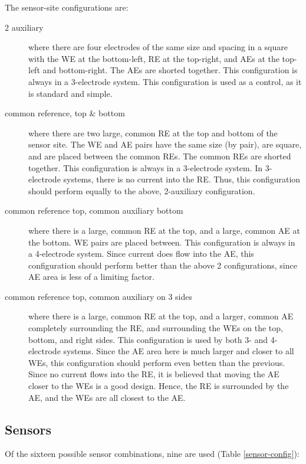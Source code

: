 The sensor-site configurations are:

\begin{description}
\item[2 auxiliary] where there are four electrodes of the same size and spacing in a square with the WE at the bottom-left, RE at the top-right, and AEs at the top-left and bottom-right. The AEs are shorted together. This configuration is always in a 3-electrode system. This configuration is used as a control, as it is standard and simple.
\item[common reference, top \& bottom] where there are two large, common RE at the top and bottom of the sensor site. The WE and AE pairs have the same size (by pair), are square, and are placed between the common REs. The common REs are shorted together. This configuration is always in a 3-electrode system. In 3-electrode systems, there is no current into the RE. Thus, this configuration should perform equally to the above, 2-auxiliary configuration.
\item[common reference top, common auxiliary bottom] where there is a large, common RE at the top, and a large, common AE at the bottom. WE pairs are placed between. This configuration is always in a 4-electrode system. Since current does flow into the AE, this configuration should perform better than the above 2 configurations, since AE area is less of a limiting factor.
\item[common reference top, common auxiliary on 3 sides] where there is a large, common RE at the top, and a larger, common AE completely surrounding the RE, and surrounding the WEs on the top, bottom, and right sides. This configuration is used by both 3- and 4-electrode systems. Since the AE area here is much larger and closer to all WEs, this configuration should perform even betten than the previous. Since no current flows into the RE, it is believed that moving the AE closer to the WEs is a good design. Hence, the RE is surrounded by the AE, and the WEs are all closest to the AE.
\end{description}

\subsection{Sensors}

Of the sixteen possible sensor combinations, nine are used (Table \ref{sensor-config}):

